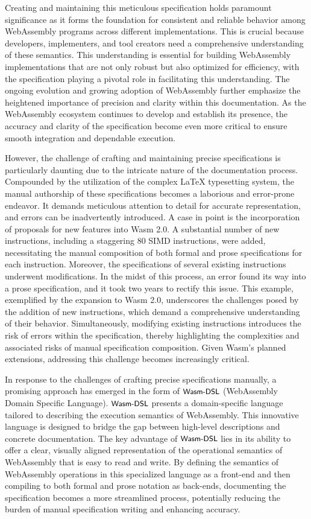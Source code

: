 Creating and maintaining this meticulous specification holds paramount
significance as it forms the foundation for consistent and reliable behavior
among WebAssembly programs across different implementations. This is crucial
because developers, implementers, and tool creators need a comprehensive
understanding of these semantics. This understanding is essential for building
WebAssembly implementations that are not only robust but also optimized for
efficiency, with the specification playing a pivotal role in facilitating this
understanding. The ongoing evolution and growing adoption of WebAssembly
further emphasize the heightened importance of precision and clarity within
this documentation. As the WebAssembly ecosystem continues to develop and
establish its presence, the accuracy and clarity of the specification become
even more critical to ensure smooth integration and dependable execution.

However, the challenge of crafting and maintaining precise specifications is
particularly daunting due to the intricate nature of the documentation process.
Compounded by the utilization of the complex LaTeX typesetting system, the
manual authorship of these specifications becomes a laborious and error-prone
endeavor. It demands meticulous attention to detail for accurate
representation, and errors can be inadvertently introduced. A case in point is
the incorporation of proposals for new features into Wasm 2.0. A substantial
number of new instructions, including a staggering 80 SIMD instructions, were
added, necessitating the manual composition of both formal and prose
specifications for each instruction. Moreover, the specifications of several
existing instructions underwent modifications. In the midst of this process, an
error found its way into a prose specification, and it took two years to
rectify this issue. This example, exemplified by the expansion to Wasm 2.0,
underscores the challenges posed by the addition of new instructions, which
demand a comprehensive understanding of their behavior. Simultaneously,
modifying existing instructions introduces the risk of errors within the
specification, thereby highlighting the complexities and associated risks of
manual specification composition. Given Wasm's planned extensions, addressing
this challenge becomes increasingly critical.

In response to the challenges of crafting precise specifications manually, a
promising approach has emerged in the form of $\textsf{\small Wasm-DSL}$ (WebAssembly Domain
Specific Language). $\textsf{\small Wasm-DSL}$ presents a domain-specific language tailored to
describing the execution semantics of WebAssembly. This innovative language is
designed to bridge the gap between high-level descriptions and concrete
documentation. The key advantage of $\textsf{\small Wasm-DSL}$ lies in its ability to offer a
clear, visually aligned representation of the operational semantics of
WebAssembly that is easy to read and write. By defining the semantics of
WebAssembly operations in this specialized language as a front-end and then
compiling to both formal and prose notation as back-ends, documenting the
specification becomes a more streamlined process, potentially reducing the
burden of manual specification writing and enhancing accuracy.

